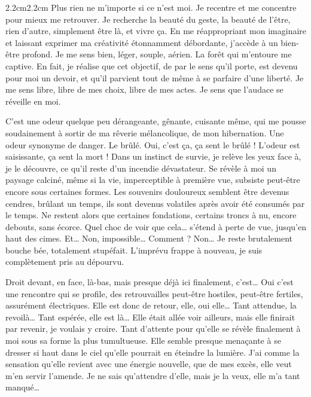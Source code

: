 \begin{adjustwidth}{2.2cm}{2.2cm}
Plus rien ne m’importe si ce n’est moi. Je recentre et me concentre pour mieux me retrouver. Je recherche la beauté du geste, la beauté de l’être, rien d’autre, simplement être là, et vivre ça. En me réappropriant mon imaginaire et laissant exprimer ma créativité étonnamment débordante, j’accède à un bien-être profond. Je me sens bien, léger, souple, aérien. La forêt qui m’entoure me captive. En fait, je réalise que cet objectif, de par le sens qu’il porte, est devenu pour moi un devoir, et qu’il parvient tout de même à se parfaire d’une liberté. Je me sens libre, libre de mes choix, libre de mes actes. Je sens que l’audace se réveille en moi.

C’est une odeur quelque peu dérangeante, gênante, cuisante même, qui me pousse soudainement à sortir de ma rêverie mélancolique, de mon hibernation. Une odeur synonyme de danger. Le brûlé. Oui, c’est ça, ça sent le brûlé ! L’odeur est saisissante, ça sent la mort ! Dans un instinct de survie, je relève les yeux face à, je le découvre, ce qu’il reste d’un incendie dévastateur. Se révèle à moi un paysage calciné, même si la vie, imperceptible à première vue, subsiste peut-être encore sous certaines formes. Les souvenirs douloureux semblent être devenus cendres, brûlant un temps, ils sont devenus volatiles après avoir été consumés par le temps. Ne restent alors que certaines fondations, certains troncs à nu, encore debouts, sans écorce. Quel choc de voir que cela… s’étend à perte de vue, jusqu’en haut des cimes. Et… Non, impossible… Comment ? Non… Je reste brutalement bouche bée, totalement stupéfait. L’imprévu frappe à nouveau, je suis complètement pris au dépourvu.

Droit devant, en face, là-bas, mais presque déjà ici finalement, c’est… Oui c’est une rencontre qui se profile, des retrouvailles peut-être hostiles, peut-être fertiles, assurément électriques. Elle est donc de retour, elle, oui elle… Tant attendue, la revoilà… Tant espérée, elle est là… Elle était allée voir ailleurs, mais elle finirait par revenir, je voulais y croire. Tant d’attente pour qu’elle se révèle finalement à moi sous sa forme la plus tumultueuse. Elle semble presque menaçante à se dresser si haut dans le ciel qu’elle pourrait en éteindre la lumière. J’ai comme la sensation qu’elle revient avec une énergie nouvelle, que de mes excès, elle veut m’en servir l’amende. Je ne sais qu’attendre d’elle, mais je la veux, elle m’a tant manqué… 


\end{adjustwidth}

